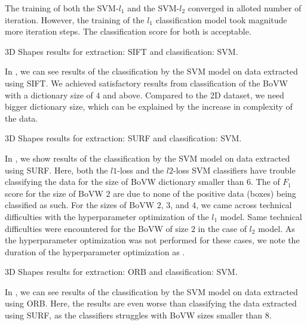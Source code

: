 The training of both the SVM-$l_1$ and the SVM-$l_2$ converged in alloted number of iteration. However, the training of the $l_1$ classification model took magnitude more iteration steps. The classification score for both is acceptable.

\begin{table}[ht!]
    \centering
    
    \caption[3D Shapes results for extraction: SIFT and classification: SVM]{3D Shapes results for extraction: SIFT and classification: SVM.}
    \label{tab:3d_SIFT_SVM}
\end{table}
In , we can see results of the classification by the SVM model on data extracted using SIFT. We achieved satisfactory results from classification of the BoVW with a dictionary size of $4$ and above. Compared to the 2D dataset, we need bigger dictionary size, which can be explained by the increase in complexity of the data.

\begin{table}[ht!]
    \centering
    
    \caption[3D Shapes results for extraction: SURF and classification: SVM]{3D Shapes results for extraction: SURF and classification: SVM.}
    \label{tab:3d_SURF_SVM}
\end{table}
In , we show results of the classification by the SVM model on data extracted using SURF. Here, both the $l1$-loss and the $l2$-loss SVM classifiers have trouble classifying the data for the size of BoVW dictionary smaller than $6$. The  of $F_1$ score for the size of BoVW $2$ are due to none of the positive data (boxes) being classified as such. For the sizes of BoVW $2$, $3$, and $4$, we came across technical difficulties with the hyperparameter optimization of the $l_1$ model. Same technical difficulties were encountered for the BoVW of size $2$ in the case of $l_2$ model. As the hyperparameter optimization was not performed for these cases, we note the duration of the hyperparameter optimization as .

\begin{table}[ht!]
    \centering
    
    \caption[3D Shapes results for extraction: ORB and classification: SVM]{3D Shapes results for extraction: ORB and classification: SVM.}
    \label{tab:3d_ORB_SVM}
\end{table}
In , we can see results of the classification by the SVM model on data extracted using ORB. Here, the results are even worse than classifying the data extracted using SURF, as the classifiers struggles with BoVW sizes smaller than $8$.


